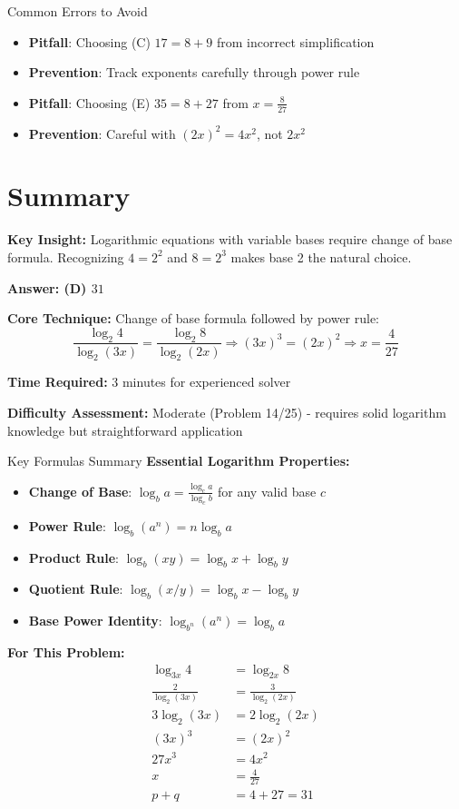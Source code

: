 \documentclass[12pt]{article}
\begin{document}
\begin{highlightbox}{Common Errors to Avoid}
\begin{itemize}
    \item \textbf{Pitfall}: Choosing (C) $17 = 8 + 9$ from incorrect simplification
    \item \textbf{Prevention}: Track exponents carefully through power rule
    
    \item \textbf{Pitfall}: Choosing (E) $35 = 8 + 27$ from $x = \frac{8}{27}$
    \item \textbf{Prevention}: Careful with $(2x)^2 = 4x^2$, not $2x^2$
\end{itemize}
\end{highlightbox}


\section*{Summary}

\textbf{Key Insight:} Logarithmic equations with variable bases require change of base formula. Recognizing $4 = 2^2$ and $8 = 2^3$ makes base 2 the natural choice.

\textbf{Answer: (D) $31$}

\textbf{Core Technique:} Change of base formula followed by power rule: 
\[\frac{\log_2 4}{\log_2(3x)} = \frac{\log_2 8}{\log_2(2x)} \Rightarrow (3x)^3 = (2x)^2 \Rightarrow x = \frac{4}{27}\]

\textbf{Time Required:} 3 minutes for experienced solver

\textbf{Difficulty Assessment:} Moderate (Problem 14/25) - requires solid logarithm knowledge but straightforward application

\begin{highlightbox}{Key Formulas Summary}
\textbf{Essential Logarithm Properties:}
\begin{itemize}
    \item \textbf{Change of Base}: $\log_b a = \frac{\log_c a}{\log_c b}$ for any valid base $c$
    \item \textbf{Power Rule}: $\log_b(a^n) = n\log_b a$
    \item \textbf{Product Rule}: $\log_b(xy) = \log_b x + \log_b y$
    \item \textbf{Quotient Rule}: $\log_b(x/y) = \log_b x - \log_b y$
    \item \textbf{Base Power Identity}: $\log_{b^n}(a^n) = \log_b a$
\end{itemize}

\textbf{For This Problem:}
\begin{align*}
\log_{3x} 4 &= \log_{2x} 8\\
\frac{2}{\log_2(3x)} &= \frac{3}{\log_2(2x)}\\
3\log_2(3x) &= 2\log_2(2x)\\
(3x)^3 &= (2x)^2\\
27x^3 &= 4x^2\\
x &= \frac{4}{27}\\
p + q &= 4 + 27 = 31
\end{align*}
\end{highlightbox}
\end{document}
